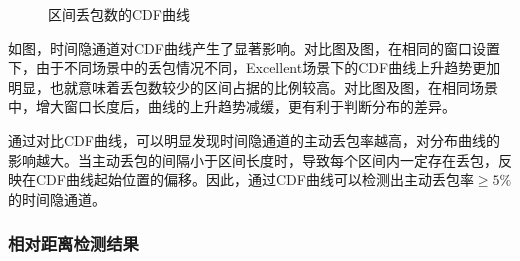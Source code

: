 {\begin{figure}[htbp]
{        }
        \caption{区间丢包数的CDF曲线}
        \label{fig:3:result:win:cdf}
	\end{figure}
}

如图，时间隐通道对CDF曲线产生了显著影响。对比图及图，在相同的窗口设置下，由于不同场景中的丢包情况不同，Excellent场景下的CDF曲线上升趋势更加明显，也就意味着丢包数较少的区间占据的比例较高。对比图及图，在相同场景中，增大窗口长度后，曲线的上升趋势减缓，更有利于判断分布的差异。

通过对比CDF曲线，可以明显发现时间隐通道的主动丢包率越高，对分布曲线的影响越大。当主动丢包的间隔小于区间长度时，导致每个区间内一定存在丢包，反映在CDF曲线起始位置的偏移。因此，通过CDF曲线可以检测出主动丢包率$\ge5\%$的时间隐通道。

\subsubsection{相对距离检测结果}
\label{chap:analyze:result:window:distance}

